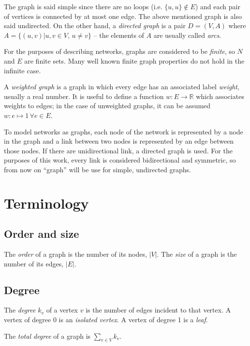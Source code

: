 \documentclass[oneside,openany]{memoir}
\begin{document}
The graph is said simple since there are no loops (i.e.
$\{u,u\} \not\in E$) and each pair of vertices is connected by at most
one edge. The above mentioned graph is also said undirected. On the
other hand, a \emph{directed graph} is a pair $D = (V, A)$ where
$A = \{(u,v) | u,v \in V,\, u \neq v\}$ -- the elements of $A$ are
usually called \emph{arcs}.

For the purposes of describing networks, graphs are considered to be
\emph{finite}, so $N$ and $E$ are finite sets. Many well known finite
graph properties do not hold in the infinite case.

A \emph{weighted graph} is a graph in which every edge has an associated
label \emph{weight}, usually a real number. It is useful to define a
function $w: E \rightarrow \mathbb{R}$ which associates weights to
edges; in the case of unweighted graphs, it can be assumed
$w: e \mapsto 1\, \forall e \in E$.

To model networks as graphs, each node of the network is represented by
a node in the graph and a link between two nodes is represented by an
edge between those nodes. If there are unidirectional link, a directed
graph is used. For the purposes of this work, every link is considered
bidirectional and symmetric, so from now on ``graph'' will be use for
simple, undirected graphs.

\section{Terminology}\label{terminology}

\subsection{Order and size}\label{order-and-size}

The \emph{order} of a graph is the number of its nodes, $|V|$. The
\emph{size} of a graph is the number of its edges, $|E|$.

\subsection{Degree}\label{degree}

The \emph{degree} $k_v$ of a vertex $v$ is the number of edges incident
to that vertex. A vertex of degree 0 is an \emph{isolated vertex}. A
vertex of degree 1 is a \emph{leaf}.

The \emph{total degree} of a graph is $\sum_{v \in V} k_v$.
\end{document}

